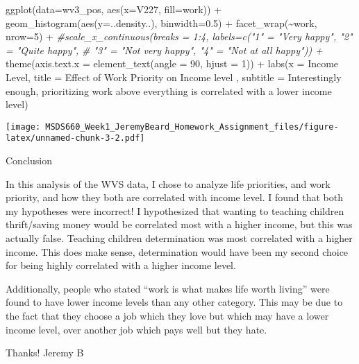 \documentclass[
]{article}
\newenvironment{Shaded}{\begin{snugshade}}{\end{snugshade}}
\newcommand{\AttributeTok}[1]{\textcolor[rgb]{0.77,0.63,0.00}{#1}}
\newcommand{\CommentTok}[1]{\textcolor[rgb]{0.56,0.35,0.01}{\textit{#1}}}
\newcommand{\DecValTok}[1]{\textcolor[rgb]{0.00,0.00,0.81}{#1}}
\newcommand{\FloatTok}[1]{\textcolor[rgb]{0.00,0.00,0.81}{#1}}
\newcommand{\FunctionTok}[1]{\textcolor[rgb]{0.00,0.00,0.00}{#1}}
\newcommand{\NormalTok}[1]{#1}
\newcommand{\SpecialCharTok}[1]{\textcolor[rgb]{0.00,0.00,0.00}{#1}}
\newcommand{\StringTok}[1]{\textcolor[rgb]{0.31,0.60,0.02}{#1}}
\begin{document}
\begin{Shaded}
\begin{Highlighting}[]
\FunctionTok{ggplot}\NormalTok{(}\AttributeTok{data=}\NormalTok{wv3\_pos, }\FunctionTok{aes}\NormalTok{(}\AttributeTok{x=}\NormalTok{V227, }\AttributeTok{fill=}\NormalTok{work)) }\SpecialCharTok{+} 
  \FunctionTok{geom\_histogram}\NormalTok{(}\FunctionTok{aes}\NormalTok{(}\AttributeTok{y=}\NormalTok{..density..), }\AttributeTok{binwidth=}\FloatTok{0.5}\NormalTok{) }\SpecialCharTok{+}
  \FunctionTok{facet\_wrap}\NormalTok{(}\SpecialCharTok{\textasciitilde{}}\NormalTok{work, }\AttributeTok{nrow=}\DecValTok{5}\NormalTok{) }\SpecialCharTok{+} 
  \CommentTok{\#scale\_x\_continuous(breaks = 1:4, labels=c("1" = "Very happy", "2" = "Quite happy",}
  \CommentTok{\#                                          "3" = "Not very happy", "4" = "Not at all happy")) +}
  \FunctionTok{theme}\NormalTok{(}\AttributeTok{axis.text.x =} \FunctionTok{element\_text}\NormalTok{(}\AttributeTok{angle =} \DecValTok{90}\NormalTok{, }\AttributeTok{hjust =} \DecValTok{1}\NormalTok{)) }\SpecialCharTok{+}
  \FunctionTok{labs}\NormalTok{(}\AttributeTok{x =} \StringTok{\textquotesingle{}Income Level\textquotesingle{}}\NormalTok{,}
       \AttributeTok{title =} \StringTok{\textquotesingle{}Effect of Work Priority on Income level\textquotesingle{}}\NormalTok{ ,}
       \AttributeTok{subtitle =} \StringTok{\textquotesingle{}Interestingly enough, prioritizing work above everything is correlated with a lower income level\textquotesingle{}}\NormalTok{)}
\end{Highlighting}
\end{Shaded}

\texttt{[image: MSDS660\_Week1\_JeremyBeard\_Homework\_Assignment\_files/figure-latex/unnamed-chunk-3-2.pdf]}

Conclusion

In this analysis of the WVS data, I chose to analyze life priorities,
and work priority, and how they both are correlated with income level. I
found that both my hypotheses were incorrect! I hypothesized that
wanting to teaching children thrift/saving money would be correlated
most with a higher income, but this was actually false. Teaching
children determination was most correlated with a higher income. This
does make sense, determination would have been my second choice for
being highly correlated with a higher income level.

Additionally, people who stated ``work is what makes life worth living''
were found to have lower income levels than any other category. This may
be due to the fact that they choose a job which they love but which may
have a lower income level, over another job which pays well but they
hate.

Thanks! Jeremy B
\end{document}
